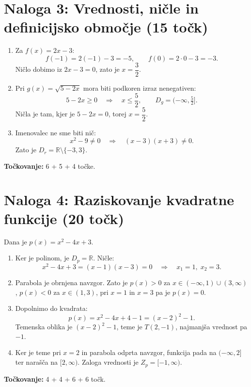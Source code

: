 \documentclass[a4paper,12pt]{article}
\begin{document}
\newpage
\section*{Naloga 3: Vrednosti, ničle in definicijsko območje \hfill\normalfont\normalsize(15 točk)}
\begin{enumerate}[label=\arabic*)]
	\item Za $f(x)=2x-3$:
	\[
		f(-1)=2(-1)-3=-5,\qquad f(0)=2\cdot0-3=-3.
	\]
	Ničlo dobimo iz $2x-3=0$, zato je $x=\dfrac32$.
	\item Pri $g(x)=\sqrt{5-2x}$ mora biti podkoren izraz nenegativen:
	\[
		5-2x\geq0\quad\Longrightarrow\quad x\leq\frac52,
		\qquad D_g=(-\infty,\tfrac52].
	\]
	Ničla je tam, kjer je $5-2x=0$, torej $x=\dfrac52$.
	\item Imenovalec ne sme biti nič:
	\[
		x^2-9\ne0\quad\Longrightarrow\quad (x-3)(x+3)\ne0.
	\]
	Zato je $D_r=\mathbb{R}\setminus\{-3,3\}$.
\end{enumerate}
\textbf{Točkovanje:} 6 + 5 + 4 točke.

\newpage
\section*{Naloga 4: Raziskovanje kvadratne funkcije \hfill\normalfont\normalsize(20 točk)}
Dana je $p(x)=x^2-4x+3$.
\begin{enumerate}[label=\arabic*)]
	\item Ker je polinom, je $D_p=\mathbb{R}$. Ničle:
	\[
		x^2-4x+3=(x-1)(x-3)=0\quad\Longrightarrow\quad x_1=1,\;x_2=3.
	\]
	\item Parabola je obrnjena navzgor. Zato je $p(x)>0$ za $x\in(-\infty,1)\cup(3,\infty)$, $p(x)<0$ za $x\in(1,3)$, pri $x=1$ in $x=3$ pa je $p(x)=0$.
	\item Dopolnimo do kvadrata:
	\[
		p(x)=x^2-4x+4-1=(x-2)^2-1.
	\]
	Temenska oblika je $(x-2)^2-1$, teme je $T(2,-1)$, najmanjša vrednost pa $-1$.
	\item Ker je teme pri $x=2$ in parabola odprta navzgor, funkcija pada na $(-\infty,2]$ ter narašča na $[2,\infty)$. Zaloga vrednosti je $Z_p=[-1,\infty)$.
\end{enumerate}
\textbf{Točkovanje:} 4 + 4 + 6 + 6 točk.

\newpage
\end{document}
